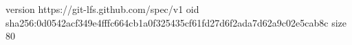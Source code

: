 version https://git-lfs.github.com/spec/v1
oid sha256:0d0542acf349e4fffc664cb1a0f325435cf61fd27d6f2ada7d62a9c02e5cab8c
size 80
